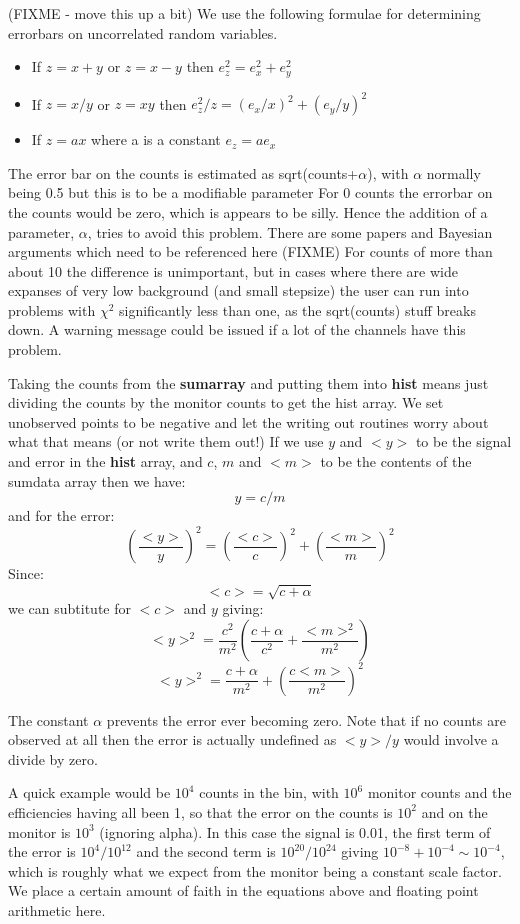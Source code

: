 \documentclass[10pt,a4paper,notitlepage]{article}
\newcommand{\var}[1]{\textbf{\textsf{#1}}} %
\begin{document}
(FIXME - move this up a bit) 
We use the following formulae for determining errorbars on uncorrelated
random variables.
\begin{itemize}
\item If $ z = x + y $ or $ z = x - y $ then 
            $ e_{z}^{2} = e_{x}^{2} + e_{y}^{2} $
\item If $z=x/y$ or $z=xy$ then $e_{z}^2/z= (e_{x}/x)^{2}+(e_{y}/y)^{2}$
\item If $ z = ax $ where a is a constant $ e_{z}=ae_{x}$
\end{itemize}

The error bar on the counts is estimated as sqrt(counts+$\alpha$), with 
$\alpha$ normally being 0.5 but this is to be a modifiable parameter
For 0 counts the errorbar on the counts would be zero, 
which is appears to be silly.
Hence the addition of a parameter, $\alpha$, tries to avoid this problem.
There are some papers and Bayesian arguments which need to be referenced
here (FIXME)
For counts of more than about 10 the difference is unimportant, but in cases
where there are wide expanses of very low background (and small stepsize) the
user can run into problems with $\chi^2$ significantly less than one, as the 
sqrt(counts) stuff breaks down.
A warning message could be issued if a lot of the channels have this problem.

Taking the counts from the \var{sumarray} and putting them into \var{hist}
means just dividing the counts by the monitor counts to get the hist array. 
We set unobserved points to be negative and let the writing out routines
worry about what that means (or not write them out!)
If we use $y$ and $<y>$ to be the signal and error in the \var{hist} array, 
and $c$, $m$ and  $<m>$ to be the contents of the sumdata array 
then we have:
\[ y = c/m \]
and for the error:
\[ \left( \frac{<y>}{y} \right) ^{2} = 
    \left( \frac{<c>}{c} \right)^{2} + \left( \frac{<m>}{m} \right)^{2} \]
Since:
\[ <c> = \sqrt{c+\alpha} \]
we can subtitute for $<c>$ and $y$ giving:
\[ <y>^{2} = \frac{c^{2}}{m^{2}} \left( \frac{c+\alpha}{c^{2}} +
 \frac{<m>^{2}}{m^{2}} \right) \]
\[ <y>^{2} = \frac{c+\alpha}{m^{2}} + \left( \frac{c<m>}{m^{2}} \right)^{2} \]

The constant $\alpha$ prevents the error ever becoming zero. 
Note that if no counts are observed at all then the error is actually
undefined as $<y>/y$ would involve a divide by zero.

A quick example would be $10^4$ counts in the bin, with $10^6$ monitor counts
and the efficiencies having all been 1, so that the error on the counts
is $10^2$ and on the monitor is $10^3$ (ignoring alpha). 
In this case the signal is 0.01, the first term of the error is $10^{4}/10^{12}$
and the second term is $10^{20}/10^{24}$ giving $10^{-8}+10^{-4} \sim 10^{-4}$,
which is roughly what we expect from the monitor being a constant scale factor.
We place a certain amount of faith in the equations above and floating point 
arithmetic here.
\end{document}
